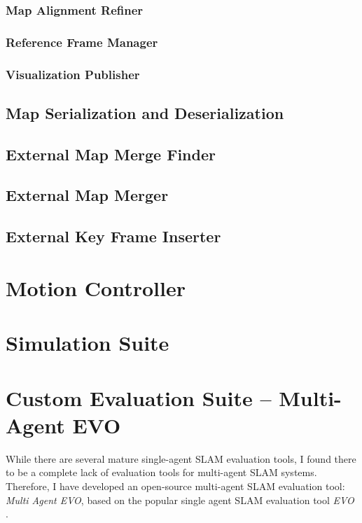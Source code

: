 \subsubsection{Map Alignment Refiner}
\label{sec:map-alignment-refiner}

\subsubsection{Reference Frame Manager}
\label{sec:reference-frame-manager}

\subsubsection{Visualization Publisher}
\label{sec:visualization-publisher}

\subsection{Map Serialization and Deserialization}
\label{sec:map-serialization-and-deserialization}

\subsection{External Map Merge Finder}
\label{sec:external-map-merge-finder}

\subsection{External Map Merger}
\label{sec:external-map-merger}

\subsection{External Key Frame Inserter}
\label{sec:external-key-frame-inserter}

\section{Motion Controller}
\label{sec:motion-controller}

\section{Simulation Suite}
\label{sec:simulation-suite}

\section{Custom Evaluation Suite – Multi-Agent EVO}
\label{sec:multi-agent-evo}
While there are several mature single-agent SLAM evaluation tools, I found there to be a complete lack of evaluation tools for multi-agent SLAM systems. Therefore, I have developed an open-source multi-agent SLAM evaluation tool: \textit{Multi Agent EVO}, based on the popular single agent SLAM evaluation tool \textit{EVO} \autocite{grupp2017evo}.

